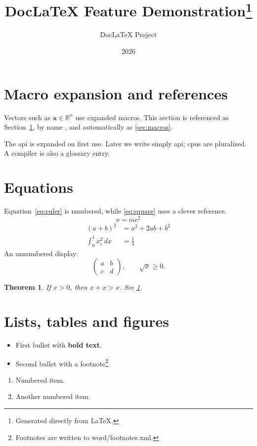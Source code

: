 \documentclass[12pt,a4paper]{article}
\title{DocLaTeX Feature Demonstration\thanks{Generated directly from LaTeX.}}
\author{DocLaTeX Project}
\date{2026}
\def\R{\mathbb{R}}
\newcommand{\E}{\mathrm{e}}
\newcommand{\vect}[1]{\mathbf{#1}}
\newtheorem{theorem}{Theorem}[section]
\begin{document}
\maketitle
\tableofcontents

\section{Macro expansion and references}\label{sec:macros}
 Vectors such as $\vect{x}\in\R^n$ use expanded macros.
This section is referenced as Section~\ref{sec:macros}, by name , and automatically as \autoref{sec:macros}.

The \gls{api} is expanded on first use. Later we write simply \gls{api}; \glspl{cpu} are pluralized.
A \gls{compiler} is also a glossary entry.

\section{Equations}\label{sec:math}
Equation~\eqref{eq:euler} is numbered, while \cref{eq:square} uses a clever reference.
\begin{equation}
  \E = mc^2 \label{eq:euler}
\end{equation}
\begin{align}
  (a+b)^2 &= a^2+2ab+b^2 \label{eq:square}\\
  \int_0^1 x_i^2\,dx &= \frac{1}{3}
\end{align}
An unnumbered display:
\[
  \left(\begin{matrix}a&b\\c&d\end{matrix}\right),\qquad \sqrt{x}\geq 0.
\]

\begin{theorem}\label{thm:sample}
If $x>0$, then $x+x>x$. See \cref{thm:sample}.
\end{theorem}

\section{Lists, tables and figures}
\begin{itemize}
  \item First bullet with \textbf{bold text}.
  \item Second bullet with a footnote\footnote{Footnotes are written to word/footnotes.xml.}.
\end{itemize}
\begin{enumerate}
  \item Numbered item.
  \item Another numbered item.
\end{enumerate}
\end{document}
